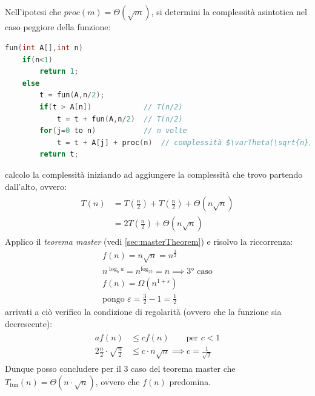\documentclass[italian]{article}
\newcommand{\fn}{f(n)}
\newcommand{\exercize}{\text{\faPencil $\;$ Esercizio }}
\begin{document}
\subsection{\exercize}
Nell'ipotesi che $proc(m) = \varTheta(\sqrt{m})$, si determini la complessità asintotica nel caso peggiore della funzione:
\begin{lstlisting}[language=c,mathescape=true]
fun(int A[],int n)
	if(n<1)
		return 1;
	else
		t = fun(A,n/2);
		if(t > A[n]) 			// T(n/2)
			t = t + fun(A,n/2)	// T(n/2)
		for(j=0 to n)			// n volte
			t = t + A[j] + proc(n)	// complessità $\varTheta(\sqrt{n})$	
		return t;
\end{lstlisting}
calcolo la complessità iniziando ad aggiungere la complessità che trovo partendo dall'alto, ovvero:
\begin{gather*}
	\begin{align*}
		T(n) &= T\left(\frac{n}{2}\right) + T\left(\frac{n}{2}\right) + \varTheta(n\sqrt{n}) \\
		&= 2T\left(\frac{n}{2}\right) + \varTheta(n\sqrt{n})
	\end{align*}
\end{gather*}
Applico il \textit{teorema master} (vedi \ref{sec:masterTheorem})  e risolvo la riccorrenza:
\begin{gather*}
	\fn = n\sqrt{n} = n^{\frac{3}{2}} \\
	n^{\log_ba} = n^{\log_22} = n \implies \text{3° caso} \\
	\fn = \varOmega(n^{1 + \varepsilon}) \\
	\text{pongo } \varepsilon = \frac{3}{2} - 1 = \frac{1}{2}
\end{gather*}
arrivati a ciò verifico la condizione di regolarità (ovvero che la funzione sia decrescente):
\begin{gather*}
	\begin{align*}
		a\fn &\leq c\fn \qquad \text{per } c < 1 \\
		2\frac{n}{2}\cdot\sqrt{\frac{n}{2}} & \leq c\cdot n\sqrt{n} \implies c = \frac{1}{\sqrt{2}}
	\end{align*}
\end{gather*}
Dunque posso concludere per il 3 caso del teorema master che $T_{\text{fun}}(n) = \varTheta(n\cdot\sqrt{n})$, ovvero che $\fn$ predomina.
\pagebreak
\end{document}
